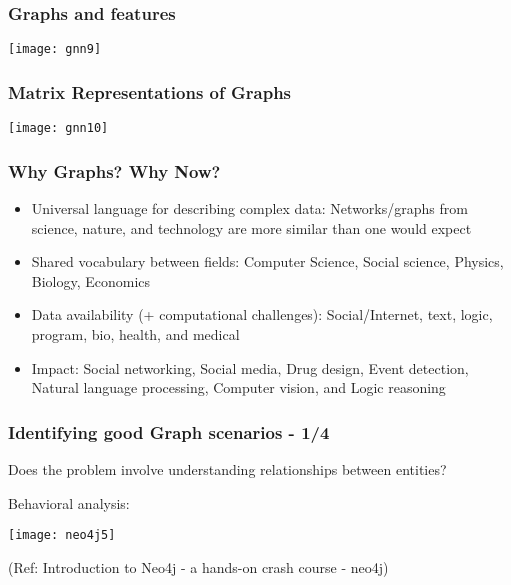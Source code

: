 \begin{frame}[fragile]\frametitle{Graphs and features}

\begin{center}
\texttt{[image: gnn9]}
\end{center}	  

\end{frame}

\begin{frame}[fragile]\frametitle{Matrix Representations of Graphs}

\begin{center}
\texttt{[image: gnn10]}
\end{center}	  

\end{frame}

\begin{frame}[fragile]\frametitle{Why Graphs? Why Now?}

\begin{itemize}
\item Universal language for describing complex data: Networks/graphs from science, nature, and technology are more similar than one would expect
\item Shared vocabulary between fields: Computer Science, Social science, Physics, Biology, Economics 
\item Data availability (+ computational challenges): Social/Internet, text, logic, program, bio, health, and medical
\item Impact: Social networking, Social media, Drug design, Event detection, Natural language processing, Computer vision, and Logic reasoning
\end{itemize}

\end{frame}

\begin{frame}\frametitle{Identifying good Graph scenarios - 1/4}

Does the problem involve understanding relationships between entities?

Behavioral analysis:

\begin{center}
\texttt{[image: neo4j5]}
\end{center}	  

{\tiny (Ref: Introduction to Neo4j - a hands-on crash course - neo4j)}
\end{frame}

